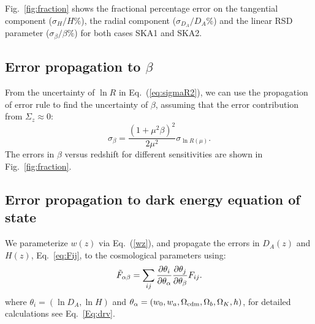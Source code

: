 \documentclass[useAMS,usenatbib]{mn2e}
\begin{document}
Fig.~\ref{fig:fraction} shows the fractional percentage error on the tangential component ($\sigma_H/H \%$), the radial component ($\sigma_{D_A}/D_A \% $) and the  linear RSD parameter ($\sigma_\beta/ \beta \%$) for both cases SKA1 and SKA2. 



\subsection{Error propagation to  $\beta$}

From the uncertainty of $\ln R$ in Eq.~(\ref{eq:sigmaR2}), we can use the propagation of error rule to find the uncertainty of $\beta$, assuming that the error contribution from $\Sigma_z \approx 0$:
\begin{equation}
\sigma_\beta  = \frac{(1+\mu^2 \beta)^{2}}{2 \mu^2} \sigma_{ \ln R(\mu)} .
\end{equation}
The errors in $\beta$  versus redshift for different sensitivities  are shown in Fig.~\ref{fig:fraction}.

 \subsection{Error propagation to dark energy equation of state}
\label{sec:darkenergy}

We parameterize $w(z)$ via Eq.~(\ref{wz}), and
propagate the errors in $D_A(z)$ and $H(z)$, Eq.~\ref{eq:Fij}, to the cosmological parameters using:
\begin{equation}
\tilde{F}_{\alpha\beta}=\sum_{ij}{\partial \theta_i\over \partial \theta_\alpha}{\partial \theta_j\over \partial \theta_\beta}F_{ij}.
\end{equation}
where $\theta_i=(\ln D_A, \ln H)$ and $\theta_\alpha=(w_0,w_a,\Omega_{\rm cdm}, \Omega_b, \Omega_K, h)$, for detailed calculations see Eq.~\ref{Eq:drv}. 
\end{document}
